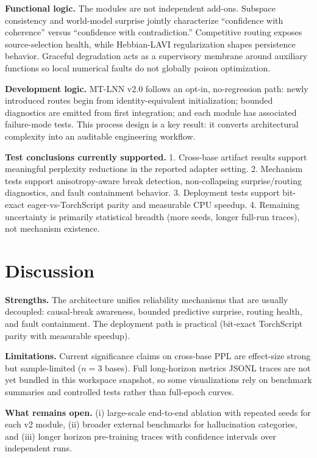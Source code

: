 \documentclass[10pt,twocolumn]{article}
\begin{document}
\textbf{Functional logic.} The modules are not independent add-ons. Subspace consistency and world-model surprise jointly characterize ``confidence with coherence'' versus ``confidence with contradiction.'' Competitive routing exposes source-selection health, while Hebbian-LAVI regularization shapes persistence behavior. Graceful degradation acts as a supervisory membrane around auxiliary functions so local numerical faults do not globally poison optimization.

\textbf{Development logic.} MT-LNN v2.0 follows an opt-in, no-regression path: newly introduced routes begin from identity-equivalent initialization; bounded diagnostics are emitted from first integration; and each module has associated failure-mode tests. This process design is a key result: it converts architectural complexity into an auditable engineering workflow.

\textbf{Test conclusions currently supported.}
1. Cross-base artifact results support meaningful perplexity reductions in the reported adapter setting.
2. Mechanism tests support anisotropy-aware break detection, non-collapsing surprise/routing diagnostics, and fault containment behavior.
3. Deployment tests support bit-exact eager-vs-TorchScript parity and measurable CPU speedup.
4. Remaining uncertainty is primarily statistical breadth (more seeds, longer full-run traces), not mechanism existence.

\section{Discussion}
\textbf{Strengths.} The architecture unifies reliability mechanisms that are usually decoupled: causal-break awareness, bounded predictive surprise, routing health, and fault containment. The deployment path is practical (bit-exact TorchScript parity with measurable speedup).

\textbf{Limitations.} Current significance claims on cross-base PPL are effect-size strong but sample-limited ($n=3$ bases). Full long-horizon metrics JSONL traces are not yet bundled in this workspace snapshot, so some visualizations rely on benchmark summaries and controlled tests rather than full-epoch curves.

\textbf{What remains open.} (i) large-scale end-to-end ablation with repeated seeds for each v2 module, (ii) broader external benchmarks for hallucination categories, and (iii) longer horizon pre-training traces with confidence intervals over independent runs.
\end{document}
